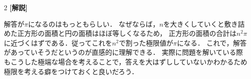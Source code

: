\documentclass[../../main.tex]{subfiles}
\begin{document}
\begin{multicols}{2}
  {\bf [解説]}

  解答が$\pi$になるのはもっともらしい．
  なぜならば，$n$を大きくしていくと敷き詰めた正方形の面積と円の面積はほぼ等しくなるため，
  正方形の面積の合計は$n^2\pi$に近づくはずである．従ってこれを$n^2$で割った極限値が$\pi$になる．
  これで，解答があっていそうだというのが直感的に理解できる．
  実際に問題を解いている際もこうした極端な場合を考えることで，答えを大はずししていないかわかるため
  極限を考える癖をつけておくと良いだろう．

  \newpage
\end{multicols}
\end{document}
